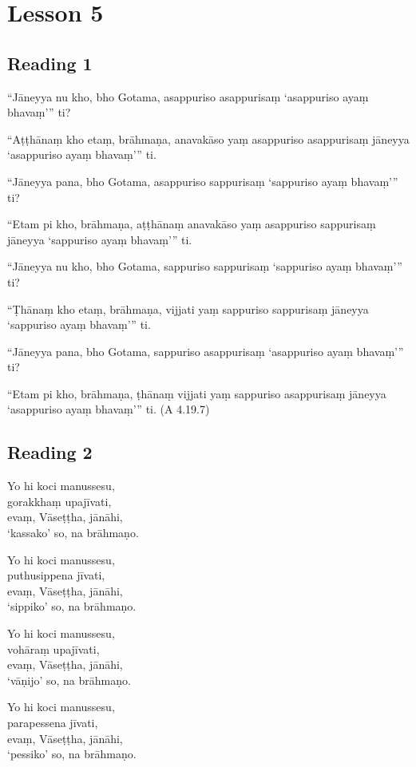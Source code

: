 \chapter{Lesson 5}

\section*{Reading 1}

“Jāneyya nu kho, bho Gotama, asappuriso asappurisaṃ ‘asappuriso ayaṃ bhavaṃ’” ti?

“Aṭṭhānaṃ kho etaṃ, brāhmaṇa, anavakāso yaṃ asappuriso asappurisaṃ jāneyya ‘asappuriso ayaṃ bhavaṃ’” ti.

“Jāneyya pana, bho Gotama, asappuriso sappurisaṃ ‘sappuriso ayaṃ bhavaṃ’” ti?

“Etam pi kho, brāhmaṇa, aṭṭhānaṃ anavakāso yaṃ asappuriso sappurisaṃ jāneyya ‘sappuriso ayaṃ bhavaṃ’” ti.

“Jāneyya nu kho, bho Gotama, sappuriso sappurisaṃ ‘sappuriso ayaṃ bhavaṃ’” ti?

“Ṭhānaṃ kho etaṃ, brāhmaṇa, vijjati yaṃ sappuriso sappurisaṃ jāneyya ‘sappuriso ayaṃ bhavaṃ’” ti.

“Jāneyya pana, bho Gotama, sappuriso asappurisaṃ ‘asappuriso ayaṃ bhavaṃ’” ti?

“Etam pi kho, brāhmaṇa, ṭhānaṃ vijjati yaṃ sappuriso asappurisaṃ jāneyya ‘asappuriso ayaṃ bhavaṃ’” ti. \hfill(A 4.19.7)

\section*{Reading 2}

Yo hi koci manussesu,\\
gorakkhaṃ upajīvati,\\
evaṃ, Vāseṭṭha, jānāhi,\\
‘kassako’ so, na brāhmaṇo.

Yo hi koci manussesu,\\
puthusippena jīvati,\\
evaṃ, Vāseṭṭha, jānāhi,\\
‘sippiko’ so, na brāhmaṇo.

Yo hi koci manussesu,\\
vohāraṃ upajīvati,\\
evaṃ, Vāseṭṭha, jānāhi,\\
‘vāṇijo’ so, na brāhmaṇo.

Yo hi koci manussesu,\\
parapessena jīvati,\\
evaṃ, Vāseṭṭha, jānāhi,\\
‘pessiko’ so, na brāhmaṇo.

